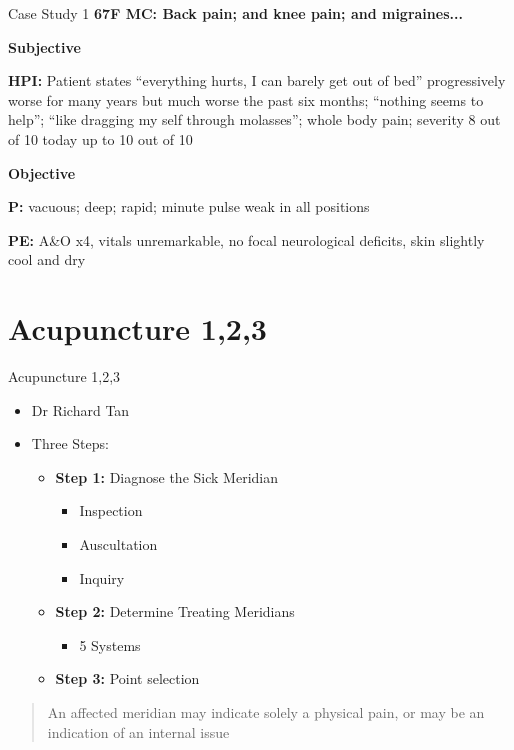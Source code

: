 \begin{frame}{Case Study 1}
  \textbf{\Large 67F MC: Back pain; and knee pain; and migraines...}
  
  \textbf{\large Subjective}
  
  \textbf{HPI:} Patient states ``everything hurts, I can barely get out of bed'' progressively worse for many years but much worse the past six months; ``nothing seems to help''; ``like dragging my self through molasses''; whole body pain; severity 8 out of 10 today up to 10 out of 10

  \textbf{\large Objective}
  
  \textbf{P:} vacuous; deep; rapid; minute pulse weak in all positions

  \textbf{PE:} A\&O x4, vitals unremarkable, no focal neurological deficits, skin slightly cool and dry

\end{frame}

\section{Acupuncture 1,2,3}

\begin{frame}{Acupuncture 1,2,3}
  \begin{itemize}
  \item Dr Richard Tan
  \item Three Steps:
    \begin{itemize} \itemsep1em
    \item \textbf{Step 1:} Diagnose the Sick Meridian
      \begin{itemize}
      \item Inspection
      \item Auscultation
      \item Inquiry
      \end{itemize}
    \item \textbf{Step 2:} Determine Treating Meridians
      \begin{itemize}
      \item{5 Systems}
      \end{itemize}
    \item \textbf{Step 3:} Point selection
    \end{itemize}
  \end{itemize}

  \begin{quote}
    An affected meridian may indicate solely a physical pain, or may be an indication of an internal issue
  \end{quote}
\end{frame}

